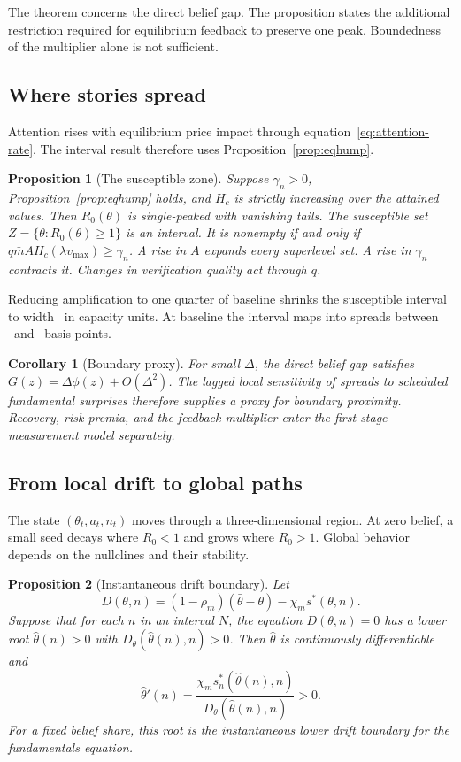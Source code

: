 \documentclass[11pt]{article}
\newtheorem{proposition}{Proposition}
\newtheorem{corollary}{Corollary}
\theoremstyle{definition}
\begin{document}
The theorem concerns the direct belief gap. The proposition states the additional restriction required for equilibrium feedback to preserve one peak. Boundedness of the multiplier alone is not sufficient.

\subsection{Where stories spread}

Attention rises with equilibrium price impact through equation~\eqref{eq:attention-rate}. The interval result therefore uses Proposition~\ref{prop:eqhump}.

\begin{proposition}[The susceptible zone]\label{prop:zone}
Suppose $\gamma_n>0$, Proposition~\ref{prop:eqhump} holds, and $H_c$ is strictly increasing over the attained values. Then $R_0(\theta)$ is single-peaked with vanishing tails. The susceptible set $Z=\{\theta:R_0(\theta)\geq1\}$ is an interval. It is nonempty if and only if $q\bar m A H_c(\lambda v_{\max})\geq\gamma_n$. A rise in $A$ expands every superlevel set. A rise in $\gamma_n$ contracts it. Changes in verification quality act through $q$.
\end{proposition}

Reducing amplification to one quarter of baseline shrinks the susceptible interval to width \ZoneWidthPre\ in capacity units. At baseline the interval maps into spreads between \ZoneSpreadLo\ and \ZoneSpreadHi\ basis points.

\begin{corollary}[Boundary proxy]\label{cor:stat}
For small $\Delta$, the direct belief gap satisfies $G(z)=\Delta\phi(z)+O(\Delta^2)$. The lagged local sensitivity of spreads to scheduled fundamental surprises therefore supplies a proxy for boundary proximity. Recovery, risk premia, and the feedback multiplier enter the first-stage measurement model separately.
\end{corollary}

\subsection{From local drift to global paths}

The state $(\theta_t,a_t,n_t)$ moves through a three-dimensional region. At zero belief, a small seed decays where $R_0<1$ and grows where $R_0>1$. Global behavior depends on the nullclines and their stability.

\begin{proposition}[Instantaneous drift boundary]\label{prop:cliff}
Let
\[
D(\theta,n)=(1-\rho_m)(\bar\theta-\theta)-\chi_m s^*(\theta,n).
\]
Suppose that for each $n$ in an interval $N$, the equation $D(\theta,n)=0$ has a lower root $\hat\theta(n)>0$ with $D_\theta(\hat\theta(n),n)>0$. Then $\hat\theta$ is continuously differentiable and
\[
\hat\theta'(n)=\frac{\chi_m s_n^*(\hat\theta(n),n)}{D_\theta(\hat\theta(n),n)}>0.
\]
For a fixed belief share, this root is the instantaneous lower drift boundary for the fundamentals equation.
\end{proposition}
\end{document}
